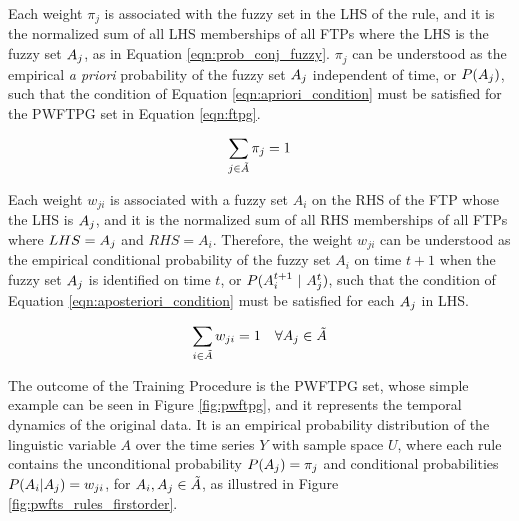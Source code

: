 \begin{enumerate}
Each weight $\pi_j$ is associated with the fuzzy set in the LHS of the rule, and it is the normalized sum of all LHS memberships of all FTPs where the LHS is the fuzzy set $A_j$, as in Equation \eqref{eqn:prob_conj_fuzzy}. $\pi_j$ can be understood as the empirical \textit{a priori} probability of the fuzzy set $A_j$ independent of time, or $P(A_j)$, such that the condition of Equation \eqref{eqn:apriori_condition} must be satisfied for the PWFTPG set in Equation \eqref{eqn:ftpg}.

\begin{equation}
    \sum_{j \in \tilde{A}} \pi_j = 1
    \label{eqn:apriori_condition}
\end{equation}

Each weight $w_{ji}$ is associated with a fuzzy set $A_i$ on the RHS of the FTP whose the LHS is $A_j$, and it is the normalized sum of all RHS memberships of all FTPs where $LHS = A_j$ and $RHS = A_i$. Therefore, the weight $w_{ji}$ can be understood as the empirical conditional probability of the fuzzy set $A_i$ on time $t+1$ when the fuzzy set $A_j$ is identified on time $t$, or $P(A_i^{t+1}\ |\ A_j^t)$, such that the condition of Equation \eqref{eqn:aposteriori_condition} must be satisfied for each $A_j$ in LHS.

\begin{equation}
    \sum_{i \in \tilde{A}} w_{ji} = 1 \quad \forall A_j \in \tilde{A}
    \label{eqn:aposteriori_condition}
\end{equation}


\end{enumerate}

The outcome of the Training Procedure is the PWFTPG set, whose simple example can be seen in Figure \ref{fig:pwftpg}, and it represents the temporal dynamics of the original data. It is an empirical probability distribution of the linguistic variable $A$ over the time series $Y$ with sample space $U$, where each rule contains the unconditional probability $P(A_j) = \pi_j$ and conditional probabilities $P(A_i | A_j) = w_{ji}$, for $A_i,A_j \in \tilde{A}$, as illustred in Figure \ref{fig:pwfts_rules_firstorder}.

